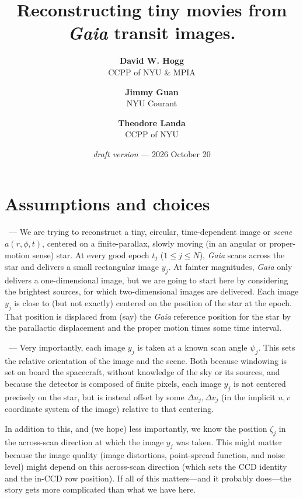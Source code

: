 \documentclass{article}
\title{\bfseries Reconstructing tiny movies from \textsl{Gaia} transit images.}
\author{%
\textbf{David W. Hogg} \\ CCPP of NYU \& MPIA
\and
\textbf{Jimmy Guan} \\ NYU Courant
\and
\textbf{Theodore Landa} \\ CCPP of NYU
}
\date{\textit{draft version} --- 2026 October 20}
\renewcommand{\paragraph}[1]{\par\medskip\noindent{\textbf{#1}}~---}
\begin{document}
\maketitle

\section{Assumptions and choices}
\paragraph{Setup}
We are trying to reconstruct a tiny, circular, time-dependent image or \emph{scene} $a(r,\phi,t)$, centered on a finite-parallax, slowly moving (in an angular or proper-motion sense) star.
At every good epoch $t_j$ ($1\leq j\leq N$), \textsl{Gaia} scans across the star and delivers a small rectangular image $y_j$.
At fainter magnitudes, \textsl{Gaia} only delivers a one-dimensional image, but we are going to start here by considering the brightest sources, for which two-dimensional images are delivered.
Each image $y_j$ is close to (but not exactly) centered on the position of the star at the epoch.
That position is displaced from (say) the \textsl{Gaia} reference position for the star by the parallactic displacement and the proper motion times some time interval.

\paragraph{Housekeeping data}
Very importantly, each image $y_j$ is taken at a known scan angle $\psi_j$.
This sets the relative orientation of the image and the scene.
Both because windowing is set on board the spacecraft, without knowledge of the sky or its sources,
and because the detector is composed of finite pixels,
each image $y_j$ is not centered precisely on the star, but is instead offset by some $\Delta u_j,\Delta v_j$ (in the implicit $u,v$ coordinate system of the image) relative to that centering.

In addition to this, and (we hope) less importantly, we know the position $\zeta_j$ in the across-scan direction at which the image $y_j$ was taken.
This might matter because the image quality (image distortions, point-spread function, and noise level) might depend on this across-scan direction (which sets the CCD identity and the in-CCD row position).
If all of this matters---and it probably does---the story gets more complicated than what we have here.
\end{document}
